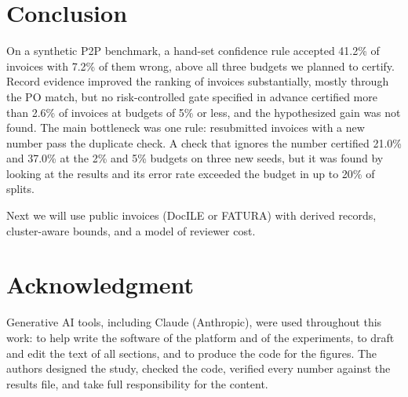 \documentclass[conference]{IEEEtran}
\begin{document}
\section{Conclusion}\label{sec:conclusion}
On a synthetic P2P benchmark, a hand-set confidence rule accepted 41.2\% of
invoices with 7.2\% of them wrong, above all three budgets we planned to
certify. Record evidence improved the ranking of invoices substantially, mostly
through the PO match, but no risk-controlled gate specified in advance certified
more than 2.6\% of invoices at budgets of 5\% or less, and the hypothesized gain
was not found. The main bottleneck was one rule: resubmitted invoices with a new
number pass the duplicate check. A check that ignores the number certified
21.0\% and 37.0\% at the 2\% and 5\% budgets on three new seeds, but it was found by looking at the
results and its error rate exceeded the budget in up to 20\% of splits.

Next we will use public invoices (DocILE or FATURA) with derived records,
cluster-aware bounds, and a model of reviewer cost.

\section*{Acknowledgment}
Generative AI tools, including Claude (Anthropic), were used throughout this work: to help write
the software of the platform and of the experiments, to draft and edit the text
of all sections, and to produce the code for the figures. The authors designed
the study, checked the code, verified every number against the results file,
and take full responsibility for the content.
\end{document}
